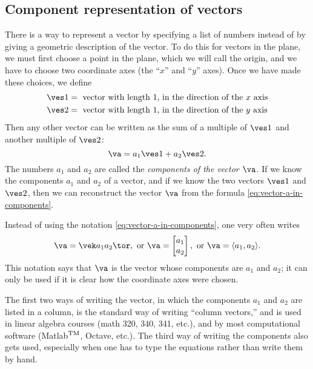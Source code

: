 \subsection{Component representation of vectors} %
There is a way to represent a vector by specifying a list of numbers
instead of by giving a geometric description of the vector.  To do
this for vectors in the plane, we must first choose a point in the
plane, which we will call the origin, and we have to choose two
coordinate axes (the ``$x$'' and ``$y$'' axes).  Once we have made
these choices, we define
\begin{align*}
  \ves1 &= \text{ vector with length $1$, in the direction of the $x$ axis} \\
  \ves2 &= \text{ vector with length $1$, in the direction of the $y$
    axis}
\end{align*}
Then any other vector can be written as the sum of a multiple of
$\ves1$ and another multiple of $\ves2$:
\begin{equation}
  \va = a_1\ves1 + a_2 \ves2.
  \label{eq:vector-a-in-components}
\end{equation}
The numbers $a_1$ and $a_2$ are called the \emph{components of the
  vector $\va$.}  If we know the components $a_1$ and $a_2$ of a
vector, and if we know the two vectors $\ves1$ and $\ves2$, then we
can reconstruct the vector $\va$ from the formula
\eqref{eq:vector-a-in-components}.

\begin{figure}[h]
  
\end{figure}

\noindent%
Instead of using the notation \eqref{eq:vector-a-in-components}, one
very often writes
\begin{equation}
  \va = \vek a_1 \\ a_2 \tor,
  \text{ or }
  \va = \begin{bmatrix}
    a_1 \\ a_2 
  \end{bmatrix}, \text{ or } \va = \langle a_1, a_2\rangle.
  \label{eq:vector-a-as-column-vector}
\end{equation}
This notation says that $\va$ is the vector whose components are $a_1$
and $a_2$; it can only be used if it is clear how the coordinate axes
were chosen.

The first two ways of writing the vector, in which the components
$a_1$ and $a_2$ are listed in a column, is the standard way of writing
``column vectors,'' and is used in linear algebra courses (math 320,
340, 341, etc.), and by most computational software (Matlab$^{\rm
  TM}$, Octave, etc.).  The third way of writing the components also
gets used, especially when one has to type the equations rather than
write them by hand.

